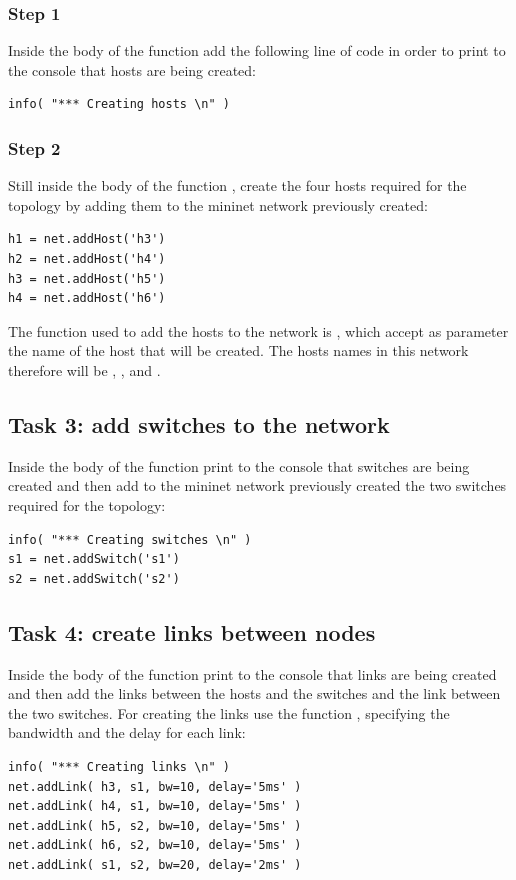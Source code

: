 \subsubsection*{Step 1}
Inside the body of the function  add the following line
of code in order to print to the console that hosts are being created:
\begin{lstlisting}
info( "*** Creating hosts \n" )
\end{lstlisting}

\subsubsection*{Step 2}
Still inside the body of the function , create the
four hosts required for the topology by adding them to the mininet network
previously created:
\begin{lstlisting}
h1 = net.addHost('h3')
h2 = net.addHost('h4')
h3 = net.addHost('h5')
h4 = net.addHost('h6')
\end{lstlisting}
The function used to add the hosts to the network is , which
accept as parameter the name of the host that will be created. The hosts names in
this network therefore will be , ,  and .





\subsection*{Task 3: add switches to the network}
Inside the body of the function  print to the console
that switches are being created and then add to the mininet network previously
created the two switches required for the topology:
\begin{lstlisting}
info( "*** Creating switches \n" )
s1 = net.addSwitch('s1')
s2 = net.addSwitch('s2')
\end{lstlisting}







\subsection*{Task 4: create links between nodes}
Inside the body of the function  print to the console
that links are being created and then add the links between the hosts and the
switches and the link between the two switches. For creating the links
use the function , specifying the bandwidth and the delay for each link:
\begin{lstlisting}
info( "*** Creating links \n" )
net.addLink( h3, s1, bw=10, delay='5ms' )
net.addLink( h4, s1, bw=10, delay='5ms' )
net.addLink( h5, s2, bw=10, delay='5ms' )
net.addLink( h6, s2, bw=10, delay='5ms' )
net.addLink( s1, s2, bw=20, delay='2ms' )
\end{lstlisting}

